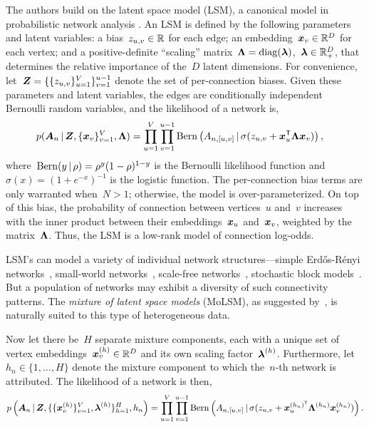 The authors build on the latent space model (LSM), a canonical model
in probabilistic network analysis \citep{hoff2002latent,
  hoff2008modeling}. An LSM is defined by the following parameters and
latent variables: a bias~${z_{u,v} \in \mathbb{R}}$ for each edge; an
embedding~${\boldsymbol{x}_v \in \mathbb{R}^D}$ for each vertex; and a
positive-definite ``scaling''
matrix~${\boldsymbol{\Lambda} = \operatorname{diag}(\boldsymbol{\lambda})}$,~$\boldsymbol{\lambda} \in \mathbb{R}_+^D$, that
determines the relative importance of the~$D$ latent dimensions.  For
convenience, let~${\boldsymbol{Z} = \{\{z_{u,v}\}_{u=1}^V\}_{v=1}^{u-1}}$ denote
the set of per-connection biases.  Given these parameters and latent
variables, the edges are conditionally independent Bernoulli random
variables, and the likelihood of a network is,
\begin{align}
  p(\boldsymbol{A}_{n} \, | \, \boldsymbol{Z}, \{\boldsymbol{x}_v\}_{v=1}^V, \boldsymbol{\Lambda})
  &= \prod_{u=1}^V \prod_{v=1}^{u-1} \mathrm{Bern} \left(A_{n, [u,v]} \, | \,
    \sigma(z_{u,v} + \boldsymbol{x}_u^{\mathsf{T}} \boldsymbol{\Lambda} \boldsymbol{x}_v)\right),
\end{align}
where~${\mathrm{Bern}(y \, | \, \rho) = \rho^y (1-\rho)^{1-y}}$ is the Bernoulli likelihood function
and~${\sigma(x) = (1+e^{-x})^{-1}}$ is the logistic function.
The per-connection bias terms are only warranted
when~${N > 1}$; otherwise, the model is over-parameterized.
On top of this bias, the probability of connection between vertices~$u$
and~$v$ increases with the inner product between their embeddings~$\boldsymbol{x}_u$
and~$\boldsymbol{x}_v$, weighted by the matrix~$\boldsymbol{\Lambda}$. Thus, the LSM is a low-rank model of connection log-odds.

LSM's can model a variety of individual network structures---simple
Erd\H{o}s-R\'{e}nyi networks~\citep{erdos1959random}, small-world
networks~\citep{watts1998collective}, scale-free
networks~\citep{barabasi1999emergence}, stochastic block
models~\citep{nowicki2001estimation, airoldi2008mixed}.  But a
population of networks may exhibit a diversity of such connectivity
patterns.  The \emph{mixture of latent space models} (MoLSM), as suggested
by~\citet{durante2016nonparametric}, is naturally suited to this type
of heterogeneous data.

Now let there
be~$H$ separate mixture components, each with 
a unique set of vertex embeddings~${\boldsymbol{x}_v^{(h)} \in \mathbb{R}^D}$
and its own scaling factor~$\boldsymbol{\lambda}^{(h)}$. Furthermore,
let~${h_n \in \{1, \ldots, H\}}$ denote the mixture component
to which the~$n$-th network is attributed. 
The likelihood of a network is then,
\begin{align}
  \label{eq:molsm_lkhd}
  p \left(\boldsymbol{A}_n \, | \,
    \boldsymbol{Z}, \{\{\boldsymbol{x}_v^{(h)}\}_{v=1}^V,
  \boldsymbol{\lambda}^{(h)}\}_{h=1}^H, h_n \right) 
  = \prod_{u=1}^V \prod_{v=1}^{u-1}
  \mathrm{Bern} \left(A_{n,[u,v]} \, | \,
    \sigma(z_{u,v} + \boldsymbol{x}_{u}^{(h_n)^{\mathsf{T}}} \boldsymbol{\Lambda}^{(h_n)} \boldsymbol{x}_v^{(h_n)}) \right).
\end{align}

